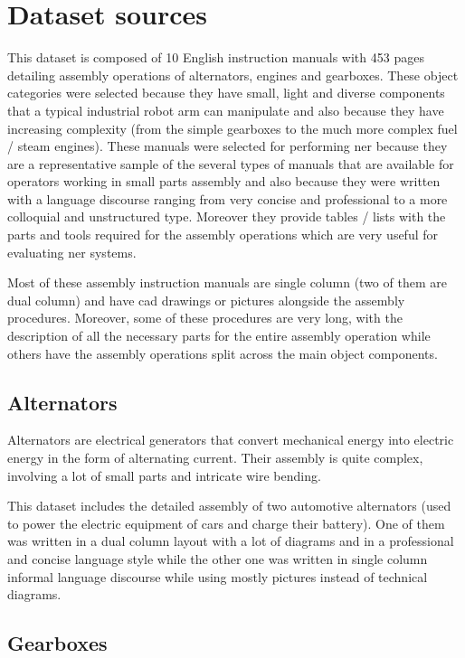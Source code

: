 \section{Dataset sources}\label{sec:dataset-sources}

This dataset is composed of 10 English instruction manuals with 453 pages detailing assembly operations of alternators, engines and gearboxes. These object categories were selected because they have small, light and diverse components that a typical industrial robot arm can manipulate and also because they have increasing complexity (from the simple gearboxes to the much more complex fuel / steam engines). These manuals were selected for performing \gls{ner} because they are a representative sample of the several types of manuals that are available for operators working in small parts assembly and also because they were written with a language discourse ranging from very concise and professional to a more colloquial and unstructured type. Moreover they provide tables / lists with the parts and tools required for the assembly operations which are very useful for evaluating \gls{ner} systems.

Most of these assembly instruction manuals are single column (two of them are dual column) and have \gls{cad} drawings or pictures alongside the assembly procedures. Moreover, some of these procedures are very long, with the description of all the necessary parts for the entire assembly operation while others have the assembly operations split across the main object components.


\subsection{Alternators}

Alternators are electrical generators that convert mechanical energy into electric energy in the form of alternating current. Their assembly is quite complex, involving a lot of small parts and intricate wire bending.

This dataset includes the detailed assembly of two automotive alternators (used to power the electric equipment of cars and charge their battery). One of them was written in a dual column layout with a lot of diagrams and in a professional and concise language style while the other one was written in single column informal language discourse while using mostly pictures instead of technical diagrams.


\subsection{Gearboxes}

